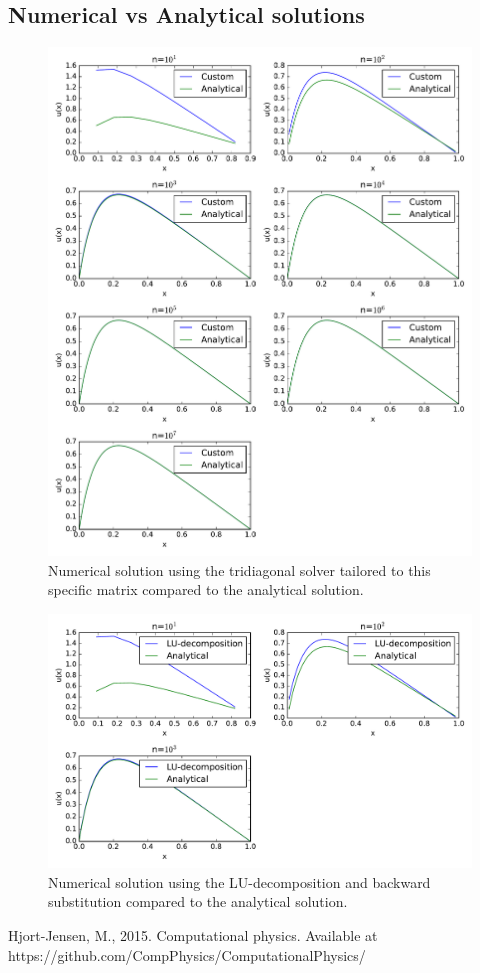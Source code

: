 \documentclass{article}
\begin{document}
\begin{appendices}
\section{Numerical vs Analytical solutions}
\label{app:diff_plots}
\begin{figure}[h]
    \includegraphics[width=0.9\linewidth]{fig/custom_vs_analytical.pdf}
    \caption{Numerical solution using the tridiagonal solver tailored to this specific matrix compared to the analytical solution.}
    \label{fig:s_vs_a}
\end{figure}

\begin{figure}[h]
    \includegraphics[width=0.9\linewidth]{fig/lud_vs_analytical.pdf}
    \caption{Numerical solution using the LU-decomposition and backward substitution compared to the analytical solution.}
    \label{fig:lud_vs_a}
\end{figure}


\end{appendices}


\clearpage

\begin{thebibliography}{1}

 Hjort-Jensen, M., 2015. Computational physics. Available at https://github.com/CompPhysics/ComputationalPhysics/
\end{thebibliography}
\end{document}
